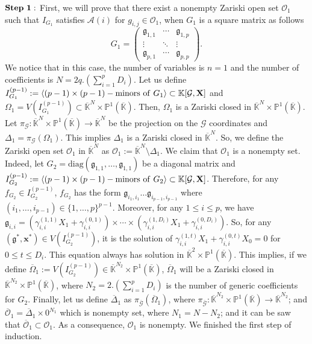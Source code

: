 \documentclass[11pt]{article}
\numberwithin{Property}{section}
\numberwithin{Theorem}{section}
\numberwithin{Proposition}{section}
\numberwithin{Lemma}{section}
\numberwithin{Corollary}{section}
\numberwithin{Definition}{section}
\numberwithin{Remark}{section}
\numberwithin{Conjecture}{section}
\numberwithin{Problem}{section}
\numberwithin{Example}{section}
\numberwithin{Claim}{section}
\renewcommand{\leq}{\leqslant}
\def\bar{\overline}
\newcommand{\field}{\mathbb{K}} %
\newcommand{\mat}[1]{\mathbf{\MakeUppercase{#1}}} %
\begin{document}
$\bf{Step \ 1:}$ First, we will prove that there exist a nonempty Zariski open set  $\mathcal{O}_1$ such that $I_{G_1}$ satisfies $\mathcal{A}(i)$ for $g_{i,j} \in\mathcal{O}_1$, when $G_1$ is a square matrix as follows
\[
G_1 = \left( \begin{matrix}
\mathfrak{g}_{1,1}  & \cdots  & \mathfrak{g}_{1, p}\\
\vdots & \ddots & \vdots \\
\mathfrak{g}_{p,1} & \cdots  & \mathfrak{g}_{p, p}
\end{matrix} \right).
\] We notice that in this case, the number of variables is $n=1$ and the number of coefficients is $N = 2q.(\sum_{i=1}^pD_i)$. Let us define $I_{G_1}^{(p-1)} := \langle (p-1) \times (p-1) - \mathrm{minors \ of \ } G_1 \rangle \subset  \field[\mathcal{G}, \mat{X}]$ and $\Omega_1 = V(I_{G_1}^{(p-1)}) \subset \bar{\field}^{N} \times \mathbb{P}^{1}(\bar{\field})$. Then, $\Omega_1$ is a Zariski closed in $\bar{\field}^{N} \times \mathbb{P}^{1}(\bar{\field})$. Let $\pi_{\mathcal{G}} : \bar{\field}^{N} \times \mathbb{P}^{1}(\bar{\field}) \to \bar{\field}^{N}$ be the projection on the $\mathcal{G}$ coordinates and $\Delta_1 = \pi_{\mathcal{G}}(\Omega_1)$. This implies $\Delta_1$ is a Zariski closed in $\bar{\field}^{N}$. So, we define the Zariski open set $\mathcal{O}_1$ in $\bar{\field}^{N}$ as $\mathcal{O}_1 := \bar{\field}^{N} \setminus \Delta_1$. We claim that $\mathcal{O}_1$ is a nonempty set. Indeed, let $G_2 = \mathrm{diag}(\mathfrak{g}_{1,1}, \ldots, \mathfrak{g}_{1,1})$ be a diagonal matrix and $I_{G_2}^{(p-1)} := \langle (p-1) \times (p-1) - \mathrm{minors \ of \ } G_2 \rangle \subset  \field[\mathcal{G}, \mat{X}]$. Therefore, for any $f_{G_2} \in I_{G_2}^{(p-1)}$, $f_{G_2}$ has the form $\mathfrak{g}_{i_1, i_1} \ldots \mathfrak{g}_{i_{p-1}, i_{p-1}}$ where $(i_1, \ldots, i_{p-1}) \in \{1, \ldots, p\}^{p-1}$. Moreover, for any $1 \leq i \leq p$, we have $\mathfrak{g}_{i,i} = (\gamma_{i,i}^{(1,1)}X_1 + \gamma_{i,i}^{(0,1)}) \times \cdots \times (\gamma_{i,i}^{(1,D_i)}X_1 + \gamma_{i,i}^{(0,D_i)})$. So, for any $(\mathfrak{g}^*, \mathbf{x}^*) \in V(I_{G_2}^{(p-1)})$, it is the solution of $\gamma_{i,i}^{(1,t)}X_1 + \gamma_{i,i}^{(0,t)}X_0 = 0$ for $0 \leq t \leq D_i$. This equation always has solution in $\bar{\field}^{2} \times \mathbb{P}^{1}(\bar{\field})$. This implies, if we define $\bar{\Omega}_1 := V(I_{G_2}^{(p-1)}) \in \bar{\field}^{N_2} \times \mathbb{P}^{1}(\bar{\field})$,  $\bar{\Omega}_1$ will be a Zariski closed in $\bar{\field}^{N_2} \times \mathbb{P}^{1}(\bar{\field})$, where $N_2 = 2.(\sum_{i = 1}^pD_i)$ is the number of generic coefficients for $G_2$. Finally, let us define $\bar{\Delta}_1$ as $\pi_{\bar{\mathcal{G}}}(\bar{\Omega}_1)$, where $\pi_{\bar{\mathcal{G}}} : \bar{\field}^{N_2} \times \mathbb{P}^{1}(\bar{\field}) \to \bar{\field}^{N_2}$; and $\bar{\mathcal{O}}_1 = \bar{\Delta}_1\times 0^{N_1}$ which is nonempty set, where $N_1 = N - N_2$; and it can be saw that 
$\bar{\mathcal{O}}_1 \subset \mathcal{O}_1$. As a consequence,  $\mathcal{O}_1$ is nonempty. We finished the first step of induction. 
\end{document}
